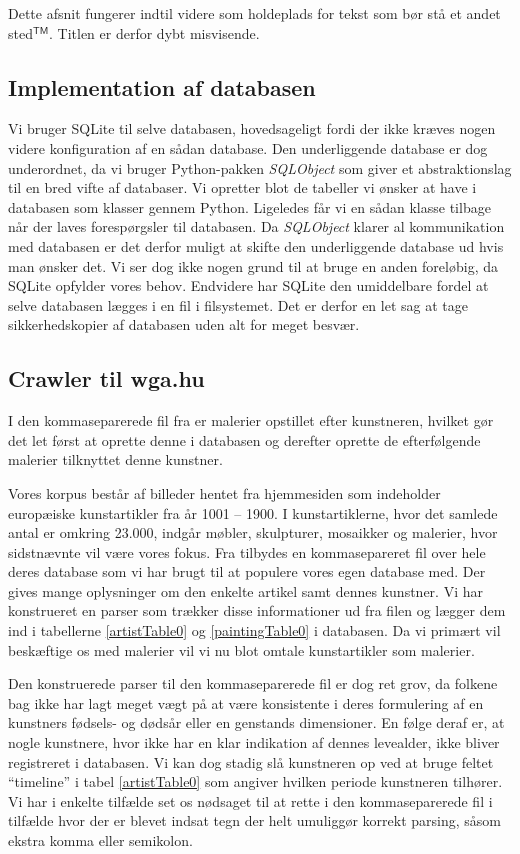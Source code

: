 {
{\sffamily Dette afsnit fungerer indtil videre som holdeplads for tekst som bør
stå et andet sted$^{\textsf{TM}}$. Titlen er derfor dybt misvisende.
}

\subsection{Implementation af databasen}
Vi bruger SQLite til selve databasen, hovedsageligt fordi der ikke kræves
nogen videre konfiguration af en sådan database. Den underliggende
database er dog underordnet, da vi bruger Python-pakken \emph{SQLObject}
som giver et abstraktionslag til en bred vifte af databaser. Vi opretter
blot de tabeller vi ønsker at have i databasen som klasser gennem
Python. Ligeledes får vi en sådan klasse tilbage når der laves
forespørgsler til databasen. Da \emph{SQLObject} klarer al kommunikation
med databasen er det derfor muligt at skifte den underliggende database
ud hvis man ønsker det. Vi ser dog ikke nogen grund til at bruge en
anden foreløbig, da SQLite opfylder vores behov. Endvidere har SQLite
den umiddelbare fordel at selve databasen lægges i en fil i filsystemet.
Det er derfor en let sag at tage sikkerhedskopier af databasen uden alt
for meget besvær.

\subsection{Crawler til wga.hu}
I den kommaseparerede fil fra \cite{wgahu} er
malerier opstillet efter kunstneren, hvilket gør det let først at
oprette denne i databasen og derefter oprette de efterfølgende malerier
tilknyttet denne kunstner.

Vores korpus består af billeder hentet fra hjemmesiden \cite{wgahu} som
indeholder europæiske kunstartikler fra år 1001 -- 1900. I
kunstartiklerne, hvor det samlede antal er omkring 23.000, indgår
møbler, skulpturer, mosaikker og malerier, hvor sidstnævnte vil være
vores fokus. Fra \cite{wgahu} tilbydes en kommasepareret fil over hele
deres database som vi har brugt til at populere vores egen database med.
Der gives mange oplysninger om den enkelte artikel samt dennes kunstner.
Vi har konstrueret en parser som trækker disse informationer ud fra
filen og lægger dem ind i tabellerne \ref{artistTable0} og
\ref{paintingTable0} i databasen. Da vi primært vil beskæftige os med
malerier vil vi nu blot omtale kunstartikler som malerier.

Den konstruerede parser til den kommaseparerede fil er dog ret grov, da
folkene bag \cite{wgahu} ikke har lagt meget vægt på at være konsistente
i deres formulering af en kunstners fødsels- og dødsår eller en
genstands dimensioner. En følge deraf er, at nogle kunstnere, hvor
\cite{wgahu} ikke har en klar indikation af dennes levealder, ikke bliver
registreret i databasen. Vi kan dog stadig slå kunstneren op ved at
bruge feltet ``timeline'' i tabel \ref{artistTable0} som angiver hvilken
periode kunstneren tilhører. Vi har i enkelte tilfælde set os nødsaget
til at rette i den kommaseparerede fil i tilfælde hvor der er blevet
indsat tegn der helt umuliggør korrekt parsing, såsom ekstra komma
eller semikolon.

}
